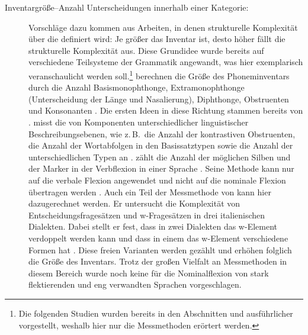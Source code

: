 \begin{exe}
\begin{exe}
\begin{description}
\item[Inventargröße--Anzahl Unterscheidungen innerhalb einer Kategorie:] Vorschläge dazu kommen aus Arbeiten, in denen strukturelle Komplexität über die  definiert wird: Je größer das Inventar ist, desto höher fällt die strukturelle Komplexität aus. Diese Grundidee wurde bereits auf verschiedene Teilsysteme der Grammatik angewandt, was hier exemplarisch veranschaulicht werden soll.\footnote{Die folgenden Studien wurden bereits in den Abschnitten  und  ausführlicher vorgestellt, weshalb hier nur die Messmethoden erörtert werden.} \citet{HayBauer2007} berechnen die Größe des Phoneminventars durch die Anzahl Basismonophthonge, Extramonophthonge (Unterscheidung der Länge und Nasalierung), Diphthonge, Obstruenten und Konsonanten \citep[389]{HayBauer2007}. Die ersten Ideen in diese Richtung stammen bereits von \citet{Jakobson1929}. \citet{Nichols2016} misst die  von Komponenten unterschiedlicher linguistischer Beschreibungsebenen, wie z.\,B.\ die Anzahl der kontrastiven Obstruenten, die Anzahl der Wortabfolgen in den Basissatztypen sowie die Anzahl der unterschiedlichen Typen an  \citep[137]{Nichols2016}. \citet{Shosted2006} zählt die Anzahl der möglichen Silben und der Marker in der Verbflexion in einer Sprache \citep[9–17]{Shosted2006}. Seine Methode kann nur auf die verbale Flexion angewendet und nicht auf die nominale Flexion übertragen werden \citep[16]{Shosted2006}. Auch ein Teil der Messmethode von \citet{Garzonio2016} kann hier dazugerechnet werden. Er untersucht die Komplexität von Entscheidungsfragesätzen und w-Fra\-ge\-sät\-zen in drei italienischen Dialekten. Dabei stellt er fest, dass in zwei Dialekten das w-E\-le\-ment verdoppelt werden kann und dass in einem das w-E\-le\-ment verschiedene Formen hat \citep[105, 109–110]{Garzonio2016}. Diese freien Varianten werden gezählt und erhöhen folglich die Größe des Inventars. Trotz der großen Vielfalt an Messmethoden in diesem Bereich wurde noch keine für die Nominalflexion von stark flektierenden und eng verwandten Sprachen vorgeschlagen.


\end{description}
\end{exe}
\end{exe}
